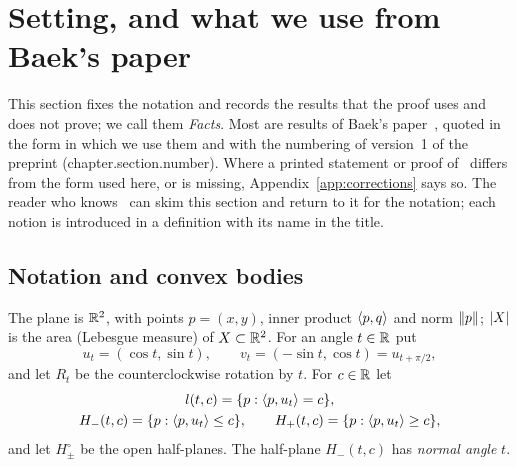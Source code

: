 \section{Setting, and what we use from Baek's paper}\label{sec:setting}

This section fixes the notation and records the results that the proof uses and
does not prove; we call them \emph{Facts}. Most are results of Baek's
paper~\cite{Baek}, quoted in the form in which we use them and with the
numbering of version~1 of the preprint (chapter.section.number). Where a printed
statement or proof of~\cite{Baek} differs from the form used here, or is
missing, Appendix~\ref{app:corrections} says so. The reader who
knows~\cite{Baek} can skim this section and return to it for the notation; each
notion is introduced in a definition with its name in the title.

\subsection{Notation and convex bodies}

The plane is $\mathbb{R}^2$, with points $p=(x,y)$, inner product $\langle p,q\rangle$ and norm
$\lVert p\rVert$; $\lvert X\rvert$ is the area (Lebesgue measure) of $X\subset\mathbb{R}^2$. For an
angle $t\in\mathbb{R}$ put
\[
  u_t=(\cos t,\sin t),\qquad v_t=(-\sin t,\cos t)=u_{t+\pi/2},
\]
and let $R_t$ be the counterclockwise rotation by $t$. For $c\in\mathbb{R}$ let
\begin{gather*}
  l(t,c)=\{p:\langle p,u_t\rangle=c\},\\
  H_-(t,c)=\{p:\langle p,u_t\rangle\le c\},\qquad H_+(t,c)=\{p:\langle p,u_t\rangle\ge c\},
\end{gather*}
and let $H^\circ_\pm$ be the open half-planes. The half-plane $H_-(t,c)$ has
\emph{normal angle} $t$.

